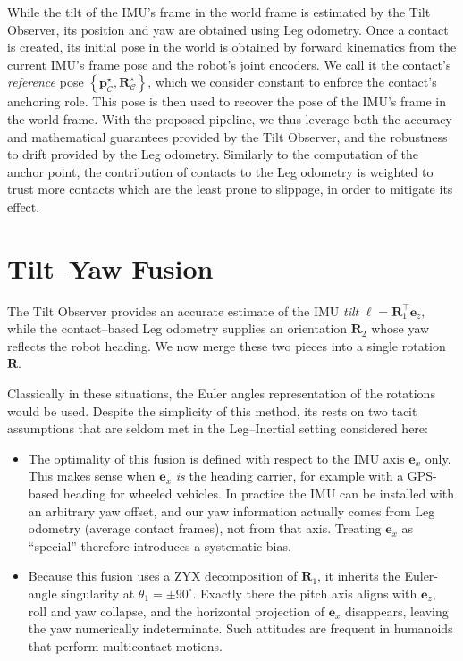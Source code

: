 \documentclass[10pt,twocolumn]{ICCAS}
\begin{document}
While the tilt of the IMU's frame in the world frame is estimated by the Tilt Observer, its position and yaw are obtained using Leg odometry. Once a contact is created, its initial pose in the world is obtained by forward kinematics from the current IMU's frame pose and the robot's joint encoders. We call it the contact's \emph{reference} pose $\left\{ \boldsymbol{p}^{\star}_{\mathcal{C}}, \boldsymbol{R}^{\star}_{\mathcal{C}}\right\}$, which we consider constant to enforce the contact's anchoring role. This pose is then used to recover the pose of the IMU's frame in the world frame. 
With the proposed pipeline, we thus leverage both the accuracy and mathematical guarantees provided by the Tilt Observer, and the robustness to drift provided by the Leg odometry. Similarly to the computation of the anchor point, the contribution of contacts to the Leg odometry is weighted to trust more contacts which are the least prone to slippage, in order to mitigate its effect.

\section{Tilt--Yaw Fusion}
The Tilt Observer provides an accurate
estimate of the IMU \emph{tilt}
\(
  \boldsymbol{\ell}=\boldsymbol{R}_{1}^{\top}\boldsymbol{e}_{z},
\)
while the contact–based Leg odometry supplies an orientation \(\boldsymbol{R}_{2}\) whose
yaw reflects the robot heading.  We now merge these two pieces into a
single rotation \(\boldsymbol{R}\).

Classically in these situations, the Euler angles representation of the rotations would be used. 
Despite the simplicity of this method, its rests on two tacit assumptions that are seldom met in the Leg–Inertial setting considered
here:

\begin{itemize}
\item The optimality of this fusion is defined with
      respect to the IMU axis $\boldsymbol{e}_{x}$ only.  
      This makes sense when $\boldsymbol{e}_{x}$ \emph{is} the heading
      carrier, for example with a GPS-based heading for wheeled vehicles.  
      In practice the IMU can be installed with an arbitrary yaw
      offset, and our yaw information actually comes from Leg odometry (average contact frames), not from
      that axis.  Treating $\boldsymbol{e}_{x}$ as ``special'' therefore
      introduces a systematic bias.

\item Because this fusion uses a ZYX decomposition of
      $\boldsymbol{R}_{1}$, it inherits the Euler-angle singularity at
      $\theta_{1}= \pm 90^{\circ}$.  
      Exactly there the pitch axis aligns with
      $\boldsymbol{e}_{z}$, roll and yaw collapse, and the horizontal
      projection of $\boldsymbol{e}_{x}$ disappears, leaving the yaw
      numerically indeterminate.  
      Such attitudes are frequent in humanoids that perform
      multicontact motions.
\end{itemize}
\end{document}
